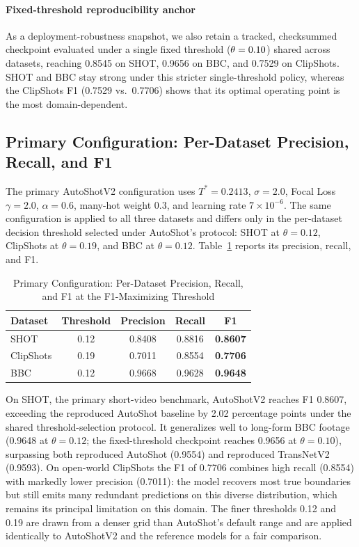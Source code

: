 \paragraph{Fixed-threshold reproducibility anchor}
As a deployment-robustness snapshot, we also retain a tracked, checksummed checkpoint evaluated under a single fixed threshold ($\theta = 0.10$) shared across datasets, reaching 0.8545 on SHOT, 0.9656 on BBC, and 0.7529 on ClipShots. SHOT and BBC stay strong under this stricter single-threshold policy, whereas the ClipShots F1 (0.7529 vs.\ 0.7706) shows that its optimal operating point is the most domain-dependent.

\subsection{Primary Configuration: Per-Dataset Precision, Recall, and F1}
\label{sec:oracle_sweep}

The primary AutoShotV2 configuration uses $T^* = 0.2413$, $\sigma = 2.0$, Focal Loss $\gamma = 2.0$, $\alpha = 0.6$, many-hot weight $0.3$, and learning rate $7 \times 10^{-6}$. The same configuration is applied to all three datasets and differs only in the per-dataset decision threshold selected under AutoShot's protocol: SHOT at $\theta = 0.12$, ClipShots at $\theta = 0.19$, and BBC at $\theta = 0.12$. Table~\ref{tab:extra_sweep_peaks} reports its precision, recall, and F1.

\begin{table}[!t]
\caption{Primary Configuration: Per-Dataset Precision, Recall, and F1 at the F1-Maximizing Threshold}
\label{tab:extra_sweep_peaks}
\centering
\small
\renewcommand{\arraystretch}{1.08}
\begin{tabular}{lcccc}
\toprule
\textbf{Dataset} & \textbf{Threshold} & \textbf{Precision} & \textbf{Recall} & \textbf{F1} \\
\midrule
SHOT & 0.12 & 0.8408 & 0.8816 & \textbf{0.8607} \\
ClipShots & 0.19 & 0.7011 & 0.8554 & \textbf{0.7706} \\
BBC & 0.12 & 0.9668 & 0.9628 & \textbf{0.9648} \\
\bottomrule
\end{tabular}
\end{table}

On SHOT, the primary short-video benchmark, AutoShotV2 reaches F1 0.8607, exceeding the reproduced AutoShot baseline by 2.02 percentage points under the shared threshold-selection protocol. It generalizes well to long-form BBC footage (0.9648 at $\theta = 0.12$; the fixed-threshold checkpoint reaches 0.9656 at $\theta = 0.10$), surpassing both reproduced AutoShot (0.9554) and reproduced TransNetV2 (0.9593). On open-world ClipShots the F1 of 0.7706 combines high recall (0.8554) with markedly lower precision (0.7011): the model recovers most true boundaries but still emits many redundant predictions on this diverse distribution, which remains its principal limitation on this domain. The finer thresholds 0.12 and 0.19 are drawn from a denser grid than AutoShot's default range and are applied identically to AutoShotV2 and the reference models for a fair comparison.

